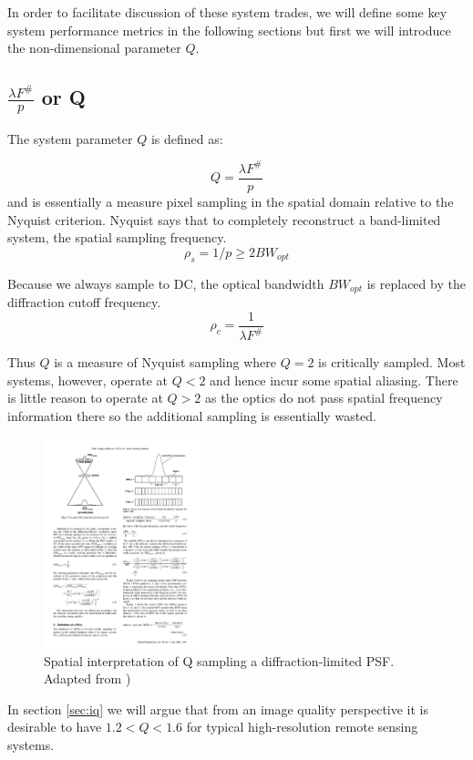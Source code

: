 \documentclass[10pt,journal]{IEEEtran}  %
\begin{document}
In order to facilitate discussion of these system trades, we will define some key system performance metrics in the following sections but first we will introduce the non-dimensional parameter $Q$.

\subsection{$\frac{\lambda F^\#}{p}$ or Q}
\label{sec:q}

The system parameter $Q$ is defined as:

\begin{equation}
Q = \frac{\lambda F^\#}{p}
\label{eq:Q}
\end{equation}
and is essentially a measure pixel sampling in the spatial domain relative to the Nyquist criterion.  Nyquist says that to completely reconstruct a band-limited system, the spatial sampling frequency. 
$$\rho_s = 1/p \geq 2 BW_{opt}$$

Because we always sample to DC, the optical bandwidth $BW_{opt}$ is replaced by the diffraction cutoff frequency.
$$\rho_c = \frac{1}{\lambda F^\#}$$

Thus $Q$ is a measure of Nyquist sampling where $Q=2$ is critically sampled.  Most systems, however, operate at $Q < 2$ and hence incur some spatial aliasing.  There is little reason to operate at $Q > 2$ as the optics do not pass spatial frequency information there so the additional sampling is essentially wasted.

\begin{figure}[h!]
\includegraphics[width=0.42\textwidth]{figures/Q_fiete.pdf}
\caption{Spatial interpretation of Q sampling a diffraction-limited PSF.  Adapted from \cite{fiete_q})}
\end{figure}

In section \ref{sec:iq} we will argue that from an image quality perspective it is desirable to have $1.2 < Q < 1.6$ for typical high-resolution remote sensing systems.  
\end{document}
